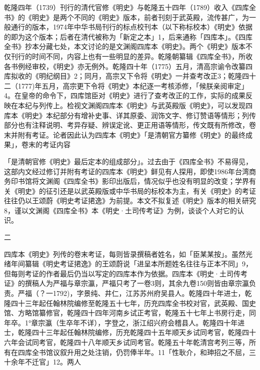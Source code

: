乾隆四年（1739）刊行的清代官修《明史》与乾隆五十四年（1789）收入《四库全书》的《明史》是两个不同的《明史》版本，前者刊刻于武英殿，流传甚广，为一般通行的版本，1974年中华书局刊行的标点校刊本（以下称标校本）《明史》依据的即为这个版本；后者在清代被称为「新定之本」1，后来通称「四库本」。《四库全书》抄本分藏七处，本文讨论的是文渊阁四库本《明史》。两个《明史》版本不仅刊行的时间不同，内容上也有一些明显的差异。乾隆朝纂辑《四库全书》，所收各书例经审校，《明史》亦无例外。乾隆四十年（1775）五月，清高宗谕令改纂四库拟收的《明纪纲目》2；同月，高宗又下令将《明史》一并查考改正3；乾隆四十二（1777)年五月，高宗更下令将《明史》本纪逐一考核添修，「候朕亲阅审定」4。在皇帝的命令下，四库馆臣对《明史》进行了查考改正的工作，实际的成果反映在本纪与列传上。检视文渊阁四库本《明史》与武英殿版《明史》，可以发现四库本《明史》本纪部分有增补史事、详其原委、润饰文字、修订赞语等情形；列传部分也有注释说明、考异存疑、辨误定讹、更正用语等情形，传文既有所修改，卷末并附有考证。论者因此认为四库本《明史》「是清朝官方纂修《明史》的最终成果」，卷末的考证内容

\vfill
\begin{BookNotes}
\end{BookNotes}

\noindent 「是清朝官修《明史》最后定本的组成部分」。过去由于《四库全书》不易得见，这部内文经过修订并附有考证的四库本《明史》鲜见有人探用，即使1986年台湾商务印书馆将文渊阁《四库全书》影印出版后，情况似乎也没有明显的改变；学界有关《明史》的征引还是以武英殿版或中华书局的标校本为主，有关《明史》的考证往往仍以王颂蔚《明史考证捃逸》为前提。本文不拟复述《明史》版本的相关研究8，谨以文渊阁《四库全书》本《明史·土司传考证》为例，谈谈个人对它的认识。

二

四库本《明史》列传的卷末考证，每则皆录撰稿者姓名，如「臣某某按」。虽然光绪年间纂辑《明史考证捃逸》的王颂蔚说「进呈本所题姓名往往与正本不同」9，但每则考证的作者最后仍当以写定的四库本作为依据。四库本《明史·土司传考证》的撰稿人为严福与章宗瀛，严福只考了一卷3则，其余九卷150则皆由章宗瀛负责。严福（？一1792)，字景纯、井仁，江苏苏州府吴县人。乾隆四十年进士，乾隆四十三年起任翰林院编修至乾隆五十七年，历充四库全书校对官，武英殿、国史馆、方略馆纂修官，乾隆四十四年河南乡试正考官，乾隆五十七年上书房行走，同年卒。1°章宗瀛（生卒年不详），字登之，浙江绍兴府会稽县人。乾隆四十年进士，乾隆四十三年起任翰林院编修，历充乾隆四十五年顺天乡试同考官，乾隆四十六年会试同考官，乾隆四十八年顺天乡试同考官。乾隆五十年乾清宫考列三等，所有在四库全书馆议叙升用之处注销，仍罚俸半年。11「性耿介，和珅招之不屈，三十余年不迁官」12。两人

